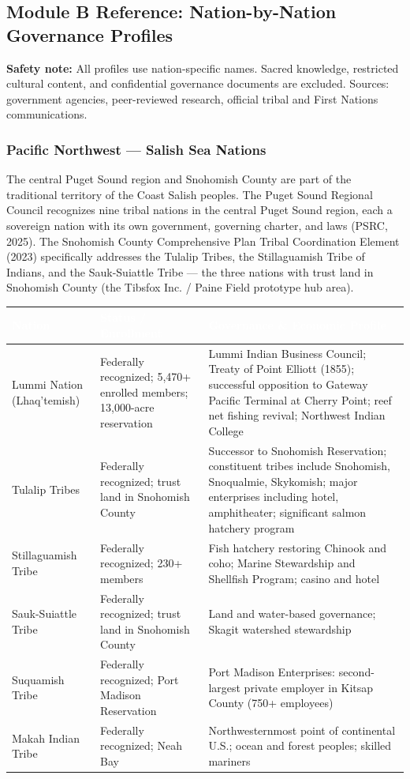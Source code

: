\documentclass[11pt,letterpaper]{article}
\newcommand{\tableheader}[1]{\textbf{\sffamily\textcolor{white}{#1}}}
\begin{document}
\subsection{Module B Reference: Nation-by-Nation Governance Profiles}

\textbf{Safety note:} All profiles use nation-specific names. Sacred knowledge, restricted cultural content, and confidential governance documents are excluded. Sources: government agencies, peer-reviewed research, official tribal and First Nations communications.

\subsubsection{Pacific Northwest --- Salish Sea Nations}

The central Puget Sound region and Snohomish County are part of the traditional territory of the Coast Salish peoples. The Puget Sound Regional Council recognizes nine tribal nations in the central Puget Sound region, each a sovereign nation with its own government, governing charter, and laws (PSRC, 2025). The Snohomish County Comprehensive Plan Tribal Coordination Element (2023) specifically addresses the Tulalip Tribes, the Stillaguamish Tribe of Indians, and the Sauk-Suiattle Tribe --- the three nations with trust land in Snohomish County (the Tibsfox Inc. / Paine Field prototype hub area).

\begin{center}
\begin{tabularx}{\textwidth}{L{3cm}L{2.5cm}X}
\toprule
{}
\tableheader{Nation} & \tableheader{Status / Enrollment} & \tableheader{Governance \& Economic Profile} \\
\midrule
Lummi Nation (Lhaq'temish) & Federally recognized; 5,470+ enrolled members; 13,000-acre reservation & Lummi Indian Business Council; Treaty of Point Elliott (1855); successful opposition to Gateway Pacific Terminal at Cherry Point; reef net fishing revival; Northwest Indian College \\
Tulalip Tribes & Federally recognized; trust land in Snohomish County & Successor to Snohomish Reservation; constituent tribes include Snohomish, Snoqualmie, Skykomish; major enterprises including hotel, amphitheater; significant salmon hatchery program \\
Stillaguamish Tribe & Federally recognized; 230+ members & Fish hatchery restoring Chinook and coho; Marine Stewardship and Shellfish Program; casino and hotel \\
Sauk-Suiattle Tribe & Federally recognized; trust land in Snohomish County & Land and water-based governance; Skagit watershed stewardship \\
Suquamish Tribe & Federally recognized; Port Madison Reservation & Port Madison Enterprises: second-largest private employer in Kitsap County (750+ employees) \\
Makah Indian Tribe & Federally recognized; Neah Bay & Northwesternmost point of continental U.S.; ocean and forest peoples; skilled mariners \\
\bottomrule
\end{tabularx}
\end{center}
\end{document}
